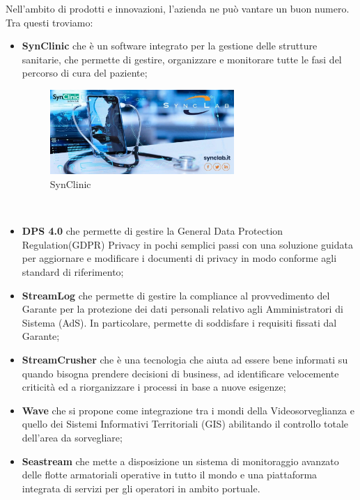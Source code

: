 Nell'ambito di prodotti e innovazioni, l'azienda ne può vantare un buon numero.
Tra questi troviamo: 
\begin{itemize}
	\item \textbf{SynClinic} che è un  software integrato per la gestione delle strutture sanitarie, che permette di gestire, organizzare e monitorare tutte le fasi del percorso di cura del paziente; \\
	\begin{figure}[htbp]	
		\centering
		\includegraphics[width=7cm]{immagini/synClinic.jpg}
		\caption{SynClinic}
		\label{fig:SynClinic}
	\end{figure}
	\\
	\item \textbf{DPS 4.0} che permette di gestire la General Data Protection Regulation(GDPR) Privacy in pochi semplici passi con una soluzione guidata per aggiornare e modificare i documenti di privacy in modo conforme agli standard di riferimento; \\
	\item \textbf{StreamLog} che permette di gestire la compliance al provvedimento del Garante per la protezione dei dati personali relativo agli Amministratori di Sistema (AdS). In particolare, permette di soddisfare i requisiti fissati dal Garante; \\
	\item \textbf{StreamCrusher} che è una tecnologia che aiuta ad essere bene informati su quando bisogna prendere decisioni di business, ad identificare velocemente criticità ed a riorganizzare i processi in base a nuove esigenze; \\
	\item \textbf{Wave} che si propone come integrazione tra i mondi della Videosorveglianza e quello dei Sistemi Informativi Territoriali (GIS) abilitando il controllo totale dell'area da sorvegliare; \\
	\item \textbf{Seastream} che mette a disposizione un sistema di monitoraggio avanzato delle flotte armatoriali operative in tutto il mondo e una piattaforma integrata di servizi per gli operatori in ambito portuale. \\
\end{itemize}




